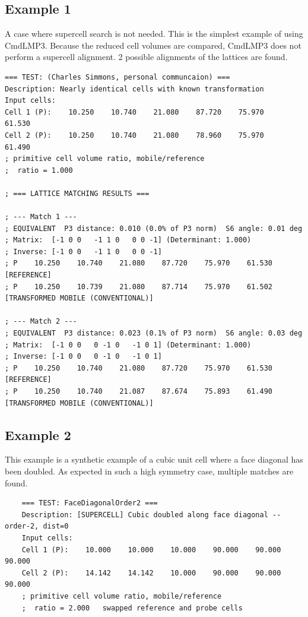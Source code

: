 \documentclass[preprint]{iucr}              %
\numberwithin{equation}{section}
\begin{document}
	\subsection{Example 1}
	A case where supercell search is not needed. This
	is the simplest example of using CmdLMP3. Because
	the reduced cell volumes are compared, CmdLMP3 does
	not perform a supercell alignment. 2 possible alignments
	of the lattices are found.
	
{
\begin{verbatim}
=== TEST: (Charles Simmons, personal communcaion) ===
Description: Nearly identical cells with known transformation
Input cells:
Cell 1 (P):    10.250    10.740    21.080    87.720    75.970    61.530 
Cell 2 (P):    10.250    10.740    21.080    78.960    75.970    61.490 
; primitive cell volume ratio, mobile/reference
;  ratio = 1.000

; === LATTICE MATCHING RESULTS ===

; --- Match 1 ---
; EQUIVALENT  P3 distance: 0.010 (0.0% of P3 norm)  S6 angle: 0.01 deg
; Matrix:  [-1 0 0   -1 1 0   0 0 -1] (Determinant: 1.000)
; Inverse: [-1 0 0   -1 1 0   0 0 -1]
; P    10.250    10.740    21.080    87.720    75.970    61.530  [REFERENCE]
; P    10.250    10.739    21.080    87.714    75.970    61.502  [TRANSFORMED MOBILE (CONVENTIONAL)]

; --- Match 2 ---
; EQUIVALENT  P3 distance: 0.023 (0.1% of P3 norm)  S6 angle: 0.03 deg
; Matrix:  [-1 0 0   0 -1 0   -1 0 1] (Determinant: 1.000)
; Inverse: [-1 0 0   0 -1 0   -1 0 1]
; P    10.250    10.740    21.080    87.720    75.970    61.530  [REFERENCE]
; P    10.250    10.740    21.087    87.674    75.893    61.490  [TRANSFORMED MOBILE (CONVENTIONAL)]

\end{verbatim}

\subsection{Example 2}
This example is a synthetic example of a cubic unit cell
where a face diagonal has been doubled. As expected in 
such a high symmetry case, multiple matches are found.

\begin{verbatim}
	=== TEST: FaceDiagonalOrder2 ===
	Description: [SUPERCELL] Cubic doubled along face diagonal -- order-2, dist=0
	Input cells:
	Cell 1 (P):    10.000    10.000    10.000    90.000    90.000    90.000 
	Cell 2 (P):    14.142    14.142    10.000    90.000    90.000    90.000 
	; primitive cell volume ratio, mobile/reference
	;  ratio = 2.000   swapped reference and probe cells
	

\end{verbatim}}
\end{document}
